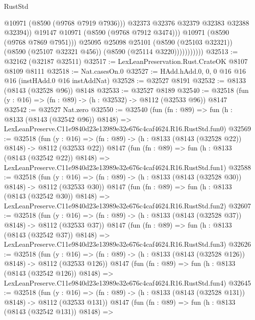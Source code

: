 \begin{lexlean}{RustStd}
\begin{coremodule}
                                @10971
                                (@8590 (@9768 @7919 @7936)))
                              @32373
                              @32376
                              @32379
                              @32383
                              @32388
                              @32394))
                          @19147
                          @10971
                          (@8590 (@9768 @7912 @3474)))
                        @10971
                        (@8590 (@9768 @7869 @7951)))
                      @25095
                      @25098
                      @25101
                      (@8590 (@25103 @32321))
                      (@8590 (@25107 @32321 @456))
                      (@8590 (@25114 @3220)))))))))))
@32513 := @32162 (@32187 @32511)
@32517 := LexLeanPreservation.Rust.CrateOK @8107 @8109 @8111
@32518 := Nat.casesOn.{0}
@32527 := HAdd.hAdd.{0, 0, 0} @16 @16 @16 (instHAdd.{0} @16 instAddNat)
@32528 := @32527 @8191
@32532 := @8133 (@8143 (@32528 @96)) @8148
@32533 := @32527 @8189
@32540 := @32518 (fun (y : @16) => (fn : @89) -> (h : @32532) -> @8112 (@32533 @96)) @8147
@32542 := @32527 Nat.zero
@32550 := @32540
    (fun (fn : @89) =>
    fun (h : @8133 (@8143 (@32542 @96)) @8148) =>
    LexLeanPreserve.C11e9840d23e13989e32e676c4caf4624.R16.RustStd.fun0)
@32569 := @32518
    (fun (y : @16) => (fn : @89) -> (h : @8133 (@8143 (@32528 @22)) @8148) -> @8112 (@32533 @22))
    @8147
    (fun (fn : @89) =>
    fun (h : @8133 (@8143 (@32542 @22)) @8148) =>
    LexLeanPreserve.C11e9840d23e13989e32e676c4caf4624.R16.RustStd.fun1)
@32588 := @32518
    (fun (y : @16) => (fn : @89) -> (h : @8133 (@8143 (@32528 @30)) @8148) -> @8112 (@32533 @30))
    @8147
    (fun (fn : @89) =>
    fun (h : @8133 (@8143 (@32542 @30)) @8148) =>
    LexLeanPreserve.C11e9840d23e13989e32e676c4caf4624.R16.RustStd.fun2)
@32607 := @32518
    (fun (y : @16) => (fn : @89) -> (h : @8133 (@8143 (@32528 @37)) @8148) -> @8112 (@32533 @37))
    @8147
    (fun (fn : @89) =>
    fun (h : @8133 (@8143 (@32542 @37)) @8148) =>
    LexLeanPreserve.C11e9840d23e13989e32e676c4caf4624.R16.RustStd.fun3)
@32626 := @32518
    (fun (y : @16) => (fn : @89) -> (h : @8133 (@8143 (@32528 @126)) @8148) -> @8112 (@32533 @126))
    @8147
    (fun (fn : @89) =>
    fun (h : @8133 (@8143 (@32542 @126)) @8148) =>
    LexLeanPreserve.C11e9840d23e13989e32e676c4caf4624.R16.RustStd.fun4)
@32645 := @32518
    (fun (y : @16) => (fn : @89) -> (h : @8133 (@8143 (@32528 @131)) @8148) -> @8112 (@32533 @131))
    @8147
    (fun (fn : @89) =>
    fun (h : @8133 (@8143 (@32542 @131)) @8148) =>

\end{coremodule}
\end{lexlean}

